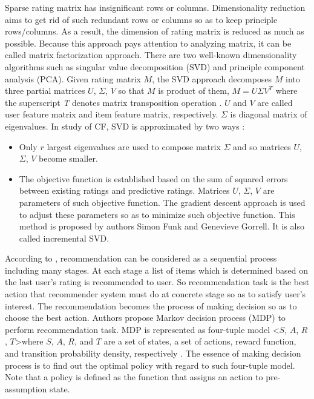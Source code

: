 \documentclass[10pt]{article}
\begin{document}
Sparse rating matrix has insignificant rows or columns. Dimensionality reduction aims to get rid of such redundant rows or columns so as to keep principle rows/columns. As a result, the dimension of rating matrix is reduced as much as possible. Because this approach pays attention to analyzing matrix, it can be called matrix factorization approach. There are two well-known dimensionality algorithms such as singular value decomposition (SVD) and principle component analysis (PCA). Given rating matrix $M$, the SVD approach decomposes $M$ into three partial matrices $U$, $\Sigma$, $V$ so that $M$ is product of them, $M = U \Sigma V^T$ where the superscript \textit{T} denotes matrix transposition operation \cite[p.~1]{percy:svd}. $U$ and $V$ are called user feature matrix and item feature matrix, respectively. $\Sigma$ is diagonal matrix of eigenvalues. In study of CF, SVD is approximated by two ways \cite[pp.~2-5]{percy:svd}:
\begin{itemize}
\item Only $r$ largest eigenvalues are used to compose matrix $\Sigma$ and so matrices $U$, $\Sigma$, $V$ become smaller.
\item The objective function is established based on the sum of squared errors between existing ratings and predictive ratings. Matrices $U$, $\Sigma$, $V$ are parameters of such objective function. The gradient descent approach is used to adjust these parameters so as to minimize such objective function. This method is proposed by authors Simon Funk and Genevieve Gorrell. It is also called incremental SVD.
\end{itemize}

According to \cite[p.~1266]{shani:mdp}, recommendation can be considered as a sequential process including many stages. At each stage a list of items which is determined based on the last user's rating is recommended to user. So recommendation task is the best action that recommender system must do at concrete stage so as to satisfy user's interest. The recommendation becomes the process of making decision so as to choose the best action. Authors \cite[p.~1266]{shani:mdp} propose Markov decision process (MDP) to perform recommendation task. MDP is represented as four-tuple model \textless$S$, $A$, $R$, $T$\textgreater where $S$, $A$, $R$, and $T$ are a set of states, a set of actions, reward function, and transition probability density, respectively \cite[pp.~1270-1271]{shani:mdp}. The essence of making decision process is to find out the optimal policy with regard to such four-tuple model. Note that a policy is defined as the function that assigns an action to pre-assumption state.
\end{document}
